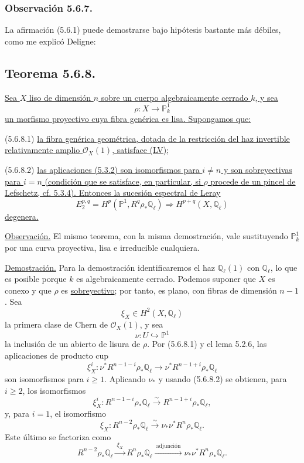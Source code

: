 \subsubsection*{Observación 5.6.7.}
La afirmación (5.6.1) puede demostrarse bajo hipótesis bastante más
débiles, como me explicó Deligne:

\subsection*{Teorema 5.6.8.}
\underline{Sea $X$ liso de dimensión $n$ sobre un cuerpo
algebraicamente cerrado $k$, y sea}
\[
\rho:X\longrightarrow\mathbb P^1_k
\]
\underline{un morfismo proyectivo cuya fibra genérica es lisa.
Supongamos que:}

\smallskip
\noindent
\textup{(5.6.8.1)}\quad
\underline{la fibra genérica geométrica, dotada de la restricción del
haz invertible relativamente amplio $\mathcal O_X(1)$, satisface (LV);}

\smallskip
\noindent
\textup{(5.6.8.2)}\quad
\underline{las aplicaciones (5.3.2) son isomorfismos para $i\ne n$ y
son sobreyectivas para $i=n$ (condición que se satisface, en
particular, si $\rho$ procede de un pincel de Lefschetz, cf. 5.3.4).
Entonces la sucesión espectral de Leray}
\[
E_2^{p,q}=H^p(\mathbb P^1,R^q\rho_*\mathbb Q_\ell)
\Longrightarrow H^{p+q}(X,\mathbb Q_\ell)
\]
\underline{degenera.}

\smallskip
\noindent
\underline{Observación.}
El mismo teorema, con la misma demostración, vale sustituyendo
$\mathbb P^1_k$ por una curva proyectiva, lisa e irreducible cualquiera.

\pageoriginale

\noindent\underline{Demostración.}
Para la demostración identificaremos el haz $\mathbb Q_\ell(1)$ con
$\mathbb Q_\ell$, lo que es posible porque $k$ es algebraicamente
cerrado. Podemos suponer que $X$ es conexo y que $\rho$ es
\underline{sobreyectivo}; por tanto, es plano, con fibras de dimensión
$n-1$. Sea
\[
\xi_X\in H^2(X,\mathbb Q_\ell)
\]
la primera clase de Chern de $\mathcal O_X(1)$, y sea
\[
\nu:U\hookrightarrow\mathbb P^1
\]
la inclusión de un abierto de lisura de $\rho$. Por (5.6.8.1) y el
lema 5.2.6, las aplicaciones de producto cup
\[
\xi_X^i:
\nu^*R^{n-1-i}\rho_*\mathbb Q_\ell
\longrightarrow
\nu^*R^{n-1+i}\rho_*\mathbb Q_\ell
\]
son isomorfismos para $i\geq1$. Aplicando $\nu_*$ y usando (5.6.8.2)
se obtienen, para $i\geq2$, los isomorfismos
\begin{equation}\tag{5.6.8.3}
\xi_X^i:R^{n-1-i}\rho_*\mathbb Q_\ell
\overset{\sim}{\longrightarrow}
R^{n-1+i}\rho_*\mathbb Q_\ell,
\end{equation}
y, para $i=1$, el isomorfismo
\begin{equation}\tag{5.6.8.4}
\xi_X:R^{n-2}\rho_*\mathbb Q_\ell
\overset{\sim}{\longrightarrow}
\nu_*\nu^*R^n\rho_*\mathbb Q_\ell.
\end{equation}
Este último se factoriza como
\begin{equation}\tag{5.6.8.5}
R^{n-2}\rho_*\mathbb Q_\ell
\xrightarrow{\ \xi_X\ }
R^n\rho_*\mathbb Q_\ell
\xrightarrow{\ \text{adjunción}\ }
\nu_*\nu^*R^n\rho_*\mathbb Q_\ell.
\end{equation}


